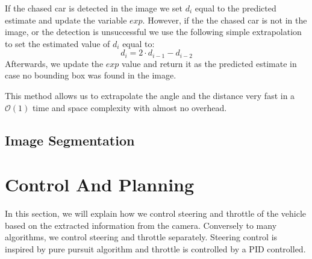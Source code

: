 If the chased car is detected in the image we set $d_i$ equal to the predicted estimate and update the variable $exp$.
However, if the the chased car is not in the image, or the detection is unsuccessful we use the following simple extrapolation to set the estimated value of $d_i$ equal to:
\begin{equation}
d_i = 2\cdot d_{i-1} - d_{i-2}
\end{equation}
Afterwards, we update the $exp$ value and return it as the predicted estimate in case no bounding box was found in the image. 
\par This method allows us to extrapolate the angle and the distance very fast in a $\mathcal{O}(1)$ time and space complexity with almost no overhead.

\subsection{Image Segmentation}


\section{Control And Planning}
In this section, we will explain how we control steering and throttle of the vehicle based on the extracted information from the camera. Conversely to many algorithms, we control steering and throttle separately. Steering control is inspired by pure pursuit algorithm and throttle is controlled by a PID controlled.


